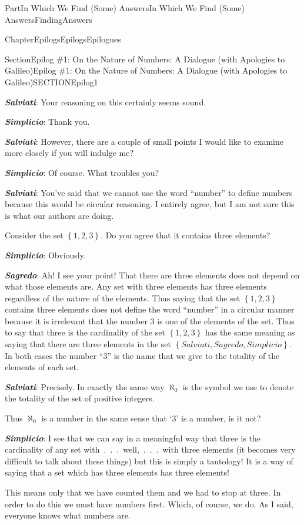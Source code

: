 \documentclass[oneside,10pt,]{book}
\newcommand{\alert}[1]{\textbf{\textit{#1}}}
\numberwithin{equation}{part}
\begin{document}
\begin{partptx}{Part}{In Which We Find (Some) Answers}{}{In Which We Find (Some) Answers}{}{}{FindingAnswers}
\begin{chapterptx}{Chapter}{Epilogs}{}{Epilogs}{}{}{Epilogues}
\begin{sectionptx}{Section}{Epilog \#1: On the Nature of Numbers: A Dialogue (with Apologies to Galileo)}{}{Epilog \#1: On the Nature of Numbers: A Dialogue (with Apologies to Galileo)}{}{}{SECTIONEpilog1}
\par
\alert{Salviati}: Your reasoning on this certainly seems sound.%
\par
\alert{Simplicio}: Thank you.%
\par
\alert{Salviati}:  However, there are a couple of small points I would like to examine more closely if you will indulge me?%
\par
\alert{Simplicio}: Of course. What troubles you?%
\par
\alert{Salviati}: You've said that we cannot use the word ``number'' to define numbers because this would be circular reasoning. I entirely agree, but I am not sure this is what our authors are doing.%
\par
Consider the set \(\left\{1, 2, 3\right\}\). Do you agree that it contains three elements?%
\par
\alert{Simplicio}: Obviously.%
\par
\alert{Sagredo}: Ah!  I see your point!  That there are three elements does not depend on what those elements are.  Any set with three elements has three elements regardless of the nature of the elements.  Thus saying that the set \(\left\{1, 2, 3\right\}\) contains three elements does not define the word ``number'' in a circular manner because it is irrelevant that the number 3 is one of the elements of the set.  Thus to say that three is the cardinality of the set \(\left\{1, 2, 3\right\}\) has the same meaning as saying that there are three elements in the set \(\left\{Salviati, Sagredo, Simplicio\right\}\).  In both cases the number ``\(3\)'' is the name that we give to the totality of the elements of each set.%
\par
\alert{Salviati}:  Precisely. In exactly the same way \(\aleph_0\) is the symbol we use to denote the totality of the set of positive integers.%
\par
Thus \(\aleph_0\) is a number in the same sense that `\(3\)' is a number, is it not?%
\par
\alert{Simplicio}:  I see that we can say in a meaningful way that three is the cardinality of any set with~.~.~.~well,~.~.~.~with three elements (it becomes very difficult to talk about these things) but this is simply a tautology! It is a way of saying that a set which has three elements has three elements!%
\par
This means only that we have counted them and we had to stop at three. In order to do this we must have numbers first. Which, of course, we do. As I said, everyone knows what numbers are.%
\par

\end{sectionptx}
\end{chapterptx}
\end{partptx}
\end{document}
